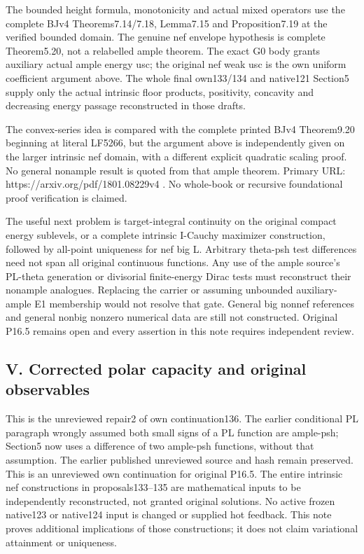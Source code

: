 \documentclass[
]{article}
\begin{document}
The bounded height formula, monotonicity and actual mixed operators use
the complete BJv4 Theorems7.14/7.18, Lemma7.15 and Proposition7.19 at
the verified bounded domain. The genuine nef envelope hypothesis is
complete Theorem5.20, not a relabelled ample theorem. The exact G0 body
grants auxiliary actual ample energy usc; the original nef weak usc is
the own uniform coefficient argument above. The whole final own133/134
and native121 Section5 supply only the actual intrinsic floor products,
positivity, concavity and decreasing energy passage reconstructed in
those drafts.

The convex-series idea is compared with the complete printed BJv4
Theorem9.20 beginning at literal LF5266, but the argument above is
independently given on the larger intrinsic nef domain, with a different
explicit quadratic scaling proof. No general nonample result is quoted
from that ample theorem. Primary URL: https://arxiv.org/pdf/1801.08229v4
. No whole-book or recursive foundational proof verification is claimed.

The useful next problem is target-integral continuity on the original
compact energy sublevels, or a complete intrinsic I-Cauchy maximizer
construction, followed by all-point uniqueness for nef big L. Arbitrary
theta-psh test differences need not span all original continuous
functions. Any use of the ample source's PL-theta generation or
divisorial finite-energy Dirac tests must reconstruct their nonample
analogues. Replacing the carrier or assuming unbounded auxiliary-ample
E1 membership would not resolve that gate. General big nonnef references
and general nonbig nonzero numerical data are still not constructed.
Original P16.5 remains open and every assertion in this note requires
independent review.

\subsection{V. Corrected polar capacity and original
observables}\label{v.-corrected-polar-capacity-and-original-observables}

This is the unreviewed repair2 of own continuation136. The earlier
conditional PL paragraph wrongly assumed both small signs of a PL
function are ample-psh; Section5 now uses a difference of two ample-psh
functions, without that assumption. The earlier published unreviewed
source and hash remain preserved. This is an unreviewed own continuation
for original P16.5. The entire intrinsic nef constructions in
proposals133--135 are mathematical inputs to be independently
reconstructed, not granted original solutions. No active frozen
native123 or native124 input is changed or supplied hot feedback. This
note proves additional implications of those constructions; it does not
claim variational attainment or uniqueness.
\end{document}
